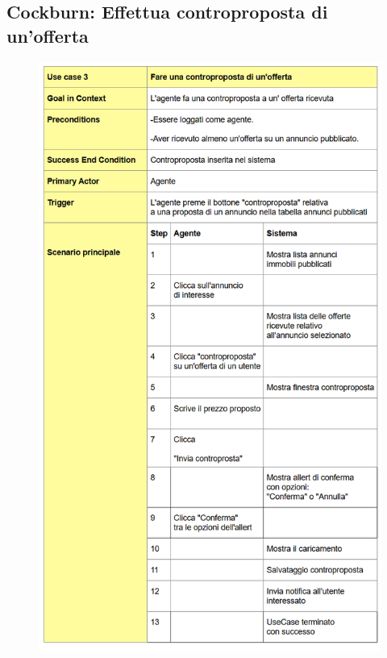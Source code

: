 \subsection{Cockburn: Effettua controproposta di un'offerta}

\begin{figure}[H]
	\centering
	\includegraphics[width=0.8\linewidth]{"Immagini/cockburn/controproposta principale.png"}
	\caption[CockBurn extensions: registra nuovo agente]{}
	\label{fig:controproposta-principale}
\end{figure}

\newpage

